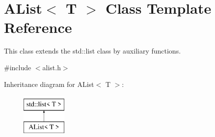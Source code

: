 \hypertarget{class_a_list}{}\section{A\+List$<$ T $>$ Class Template Reference}
\label{class_a_list}


This class extends the std\+::list class by auxiliary functions.  




{\ttfamily \#include $<$alist.\+h$>$}

Inheritance diagram for A\+List$<$ T $>$\+:\begin{figure}[H]
\begin{center}
\leavevmode
\includegraphics[height=2.000000cm]{class_a_list}
\end{center}
\end{figure}
